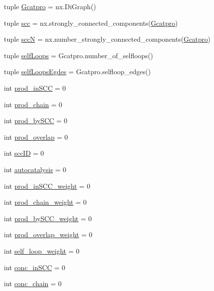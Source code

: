 \begin{DoxyCompactItemize}
tuple \hyperlink{a00102_ad88c3dd8eb89ddbe8720462b03f35003}{Gcatpro} = nx.\-Di\-Graph()
\item 
tuple \hyperlink{a00102_a2094b7f0917a16a948a2d1c4d700e84c}{scc} = nx.\-strongly\-\_\-connected\-\_\-components(\hyperlink{a00102_ad88c3dd8eb89ddbe8720462b03f35003}{Gcatpro})
\item 
tuple \hyperlink{a00102_a185cbf8ef1ec67f52695562582418793}{scc\-N} = nx.\-number\-\_\-strongly\-\_\-connected\-\_\-components(\hyperlink{a00102_ad88c3dd8eb89ddbe8720462b03f35003}{Gcatpro})
\item 
tuple \hyperlink{a00102_a8fec45ae9b70981ce94eaeed14d888b1}{self\-Loops} = Gcatpro.\-number\-\_\-of\-\_\-selfloops()
\item 
tuple \hyperlink{a00102_ad34596e89eef2cfb696f61a810765c7a}{self\-Loops\-Egdes} = Gcatpro.\-selfloop\-\_\-edges()
\item 
int \hyperlink{a00102_adbc76b0558ceb74d798b35146a583474}{prod\-\_\-in\-S\-C\-C} = 0
\item 
int \hyperlink{a00102_ab307c6047e4d16ec0335266b24e7db5a}{prod\-\_\-chain} = 0
\item 
int \hyperlink{a00102_abb2ac92624837ae48b882d145c5aab11}{prod\-\_\-by\-S\-C\-C} = 0
\item 
int \hyperlink{a00102_a213e964195f0666d00663ca874a09caa}{prod\-\_\-overlap} = 0
\item 
int \hyperlink{a00102_a1dd3c43841ba4485a66889600f099a0c}{scc\-I\-D} = 0
\item 
int \hyperlink{a00102_a70ccd5d519e878c6c8a7d0aa73caf46c}{autocatalysis} = 0
\item 
int \hyperlink{a00102_aa22adccedd9ae548d0687df507ebd92d}{prod\-\_\-in\-S\-C\-C\-\_\-weight} = 0
\item 
int \hyperlink{a00102_a6736365f1f19058f6e1d57287383dbcc}{prod\-\_\-chain\-\_\-weight} = 0
\item 
int \hyperlink{a00102_a5f45dbe461b3b18021c93780e87cc40e}{prod\-\_\-by\-S\-C\-C\-\_\-weight} = 0
\item 
int \hyperlink{a00102_ab78b07d6cd1a94356c4fee43dfc1272a}{prod\-\_\-overlap\-\_\-weight} = 0
\item 
int \hyperlink{a00102_ae9790fbc87f233c94224436a9cbd59c1}{self\-\_\-loop\-\_\-weight} = 0
\item 
int \hyperlink{a00102_a3fcb8f9c7e88b5c53f1201a383b38666}{conc\-\_\-in\-S\-C\-C} = 0
\item 
int \hyperlink{a00102_a3188cc39362e42ecb36d23a98f2b5a78}{conc\-\_\-chain} = 0
\item 

\end{DoxyCompactItemize}
